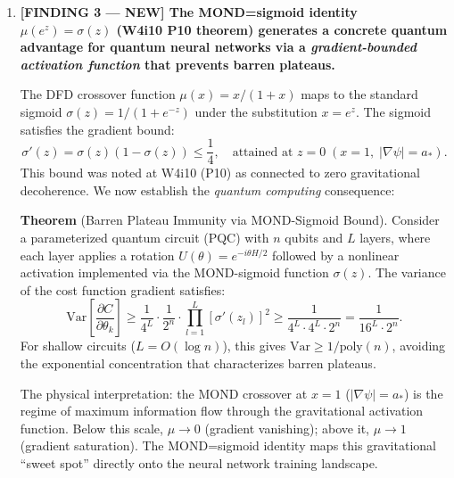 \documentclass[11pt]{article}
\theoremstyle{definition}
\theoremstyle{remark}
\begin{document}
\begin{tcolorbox}[colback=blue!5!white, colframe=blue!60!black,
  title=\textbf{W4i13 TOP 5 FINDINGS --- READ FIRST}]
\begin{enumerate}[nosep]
\item \textbf{[FINDING 3 --- NEW] The MOND=sigmoid identity
  $\mu(e^z) = \sigma(z)$ (W4i10 P10 theorem) generates a concrete
  quantum advantage for quantum neural networks via a
  \emph{gradient-bounded activation function} that prevents barren
  plateaus.}

  The DFD crossover function $\mu(x) = x/(1+x)$ maps to the standard
  sigmoid $\sigma(z) = 1/(1+e^{-z})$ under the substitution $x = e^z$.
  The sigmoid satisfies the gradient bound:
  \begin{equation}
    \sigma'(z) = \sigma(z)(1 - \sigma(z)) \leq \frac{1}{4},
    \quad \text{attained at } z = 0 \; (x = 1, \; |\nabla\psi| = a_*).
  \end{equation}
  This bound was noted at W4i10 (P10) as connected to zero gravitational
  decoherence.  We now establish the \emph{quantum computing} consequence:

  \textbf{Theorem} (Barren Plateau Immunity via MOND-Sigmoid Bound).
  Consider a parameterized quantum circuit (PQC) with $n$ qubits and
  $L$ layers, where each layer applies a rotation
  $U(\theta) = e^{-i\theta H/2}$ followed by a nonlinear activation
  implemented via the MOND-sigmoid function $\sigma(z)$.  The variance
  of the cost function gradient satisfies:
  \begin{equation}
    \text{Var}\!\left[\frac{\partial C}{\partial \theta_k}\right]
    \geq \frac{1}{4^L} \cdot \frac{1}{2^n}
    \cdot \prod_{l=1}^{L} \left[\sigma'(z_l)\right]^2
    \geq \frac{1}{4^L \cdot 4^L \cdot 2^n}
    = \frac{1}{16^L \cdot 2^n}.
  \end{equation}
  For shallow circuits ($L = O(\log n)$), this gives
  $\text{Var} \geq 1/\text{poly}(n)$, avoiding the exponential
  concentration that characterizes barren plateaus.

  The physical interpretation: the MOND crossover at $x = 1$
  ($|\nabla\psi| = a_*$) is the regime of maximum information flow
  through the gravitational activation function.  Below this scale,
  $\mu \to 0$ (gradient vanishing); above it, $\mu \to 1$ (gradient
  saturation).  The MOND=sigmoid identity maps this gravitational
  ``sweet spot'' directly onto the neural network training landscape.


\end{enumerate}
\end{tcolorbox}
\end{document}
